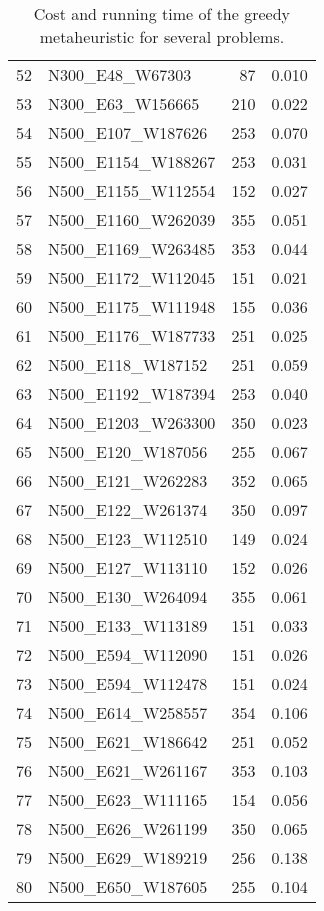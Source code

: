 \begin{table}
\begin{tabular}{llrr}
52 &     N300\_E48\_W67303 &    87 &             0.010 \\
53 &    N300\_E63\_W156665 &   210 &             0.022 \\
54 &   N500\_E107\_W187626 &   253 &             0.070 \\
55 &  N500\_E1154\_W188267 &   253 &             0.031 \\
56 &  N500\_E1155\_W112554 &   152 &             0.027 \\
57 &  N500\_E1160\_W262039 &   355 &             0.051 \\
58 &  N500\_E1169\_W263485 &   353 &             0.044 \\
59 &  N500\_E1172\_W112045 &   151 &             0.021 \\
60 &  N500\_E1175\_W111948 &   155 &             0.036 \\
61 &  N500\_E1176\_W187733 &   251 &             0.025 \\
62 &   N500\_E118\_W187152 &   251 &             0.059 \\
63 &  N500\_E1192\_W187394 &   253 &             0.040 \\
64 &  N500\_E1203\_W263300 &   350 &             0.023 \\
65 &   N500\_E120\_W187056 &   255 &             0.067 \\
66 &   N500\_E121\_W262283 &   352 &             0.065 \\
67 &   N500\_E122\_W261374 &   350 &             0.097 \\
68 &   N500\_E123\_W112510 &   149 &             0.024 \\
69 &   N500\_E127\_W113110 &   152 &             0.026 \\
70 &   N500\_E130\_W264094 &   355 &             0.061 \\
71 &   N500\_E133\_W113189 &   151 &             0.033 \\
72 &   N500\_E594\_W112090 &   151 &             0.026 \\
73 &   N500\_E594\_W112478 &   151 &             0.024 \\
74 &   N500\_E614\_W258557 &   354 &             0.106 \\
75 &   N500\_E621\_W186642 &   251 &             0.052 \\
76 &   N500\_E621\_W261167 &   353 &             0.103 \\
77 &   N500\_E623\_W111165 &   154 &             0.056 \\
78 &   N500\_E626\_W261199 &   350 &             0.065 \\
79 &   N500\_E629\_W189219 &   256 &             0.138 \\
80 &   N500\_E650\_W187605 &   255 &             0.104 \\
\bottomrule
\end{tabular}
\caption{Cost and running time of the greedy metaheuristic for several problems.}
\label{table:greedy-results}
\end{table}

